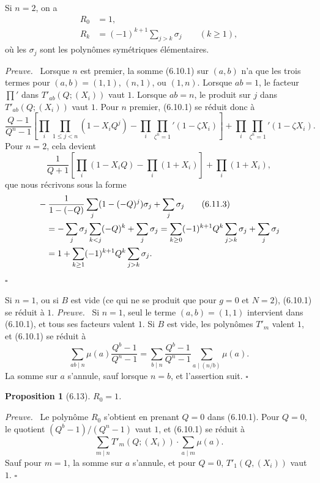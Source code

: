 \documentclass[10pt]{article}
\theoremstyle{deligne}
\newtheorem*{proposition*}{Proposition}
\newenvironment{proofdel}[1][Preuve.]{\textit{#1}\ }{\hfill$\square$}
\newcommand{\heading}[1]{\vspace{0.7em}\noindent{\bfseries #1}\quad}
\begin{document}
\heading{Exemple 6.11.} Si $n=2$, on a
\begin{align}
R_0&=1,\tag{6.11.1}\\
R_k&=(-1)^{k+1}\sum_{j>k}\sigma_j \qquad (k\ge1),\tag{6.11.2}
\end{align}
où les $\sigma_j$ sont les polynômes symétriques élémentaires.

\begin{proofdel}
Lorsque $n$ est premier, la somme (6.10.1) sur $(a,b)$ n'a que les trois termes pour $(a,b)=(1,1)$, $(n,1)$, ou $(1,n)$. Lorsque $ab=1$, le facteur $\prod'$ dans $T'_{ab}(Q;(X_i))$ vaut $1$. Lorsque $ab=n$, le produit sur $j$ dans $T'_{ab}(Q;(X_i))$ vaut $1$. Pour $n$ premier, (6.10.1) se réduit donc à
\begin{equation}\tag{6.11.1}
\frac{Q-1}{Q^n-1}\left[\prod_i\prod_{1\le j<n}(1-X_iQ^j)-\prod_i\prod_{\zeta^n=1}'(1-\zeta X_i)\right]
+\prod_i\prod_{\zeta^n=1}'(1-\zeta X_i).
\end{equation}
Pour $n=2$, cela devient
\begin{equation}\tag{6.11.2}
\frac{1}{Q+1}\left[\prod_i(1-X_iQ)-\prod_i(1+X_i)\right]+\prod_i(1+X_i),
\end{equation}
que nous récrivons sous la forme
\begin{align}
&-\frac{1}{1-(-Q)}\sum_j(1-(-Q)^j)\sigma_j+\sum_j\sigma_j\tag{6.11.3}\\
&\quad=-\sum_j\sigma_j\sum_{k<j}(-Q)^k+\sum_j\sigma_j
=\sum_{k\ge0}(-1)^{k+1}Q^k\sum_{j>k}\sigma_j+\sum_j\sigma_j\notag\\
&\quad=1+\sum_{k\ge1}(-1)^{k+1}Q^k\sum_{j>k}\sigma_j.\notag
\end{align}
\end{proofdel}

\heading{Exemple 6.12.} Si $n=1$, ou si $B$ est vide (ce qui ne se produit que pour $g=0$ et $N=2$), (6.10.1) se réduit à $1$.
\begin{proofdel}
Si $n=1$, seul le terme $(a,b)=(1,1)$ intervient dans (6.10.1), et tous ses facteurs valent $1$. Si $B$ est vide, les polynômes $T'_m$ valent $1$, et (6.10.1) se réduit à
\[
\sum_{ab\mid n}\mu(a)\frac{Q^b-1}{Q^n-1}
=\sum_{b\mid n}\frac{Q^b-1}{Q^n-1}\sum_{a\mid(n/b)}\mu(a).
\]
La somme sur $a$ s'annule, sauf lorsque $n=b$, et l'assertion suit.
\end{proofdel}

\begin{proposition*}[6.13]
$R_0=1$.
\end{proposition*}
\begin{proofdel}
Le polynôme $R_0$ s'obtient en prenant $Q=0$ dans (6.10.1). Pour $Q=0$, le quotient $(Q^b-1)/(Q^n-1)$ vaut $1$, et (6.10.1) se réduit à
\[
\sum_{m\mid n}T'_m(Q;(X_i))\cdot\sum_{a\mid m}\mu(a).
\]
Sauf pour $m=1$, la somme sur $a$ s'annule, et pour $Q=0$, $T'_1(Q,(X_i))$ vaut $1$.
\end{proofdel}
\end{document}
